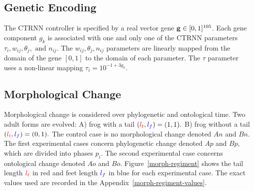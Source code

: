 \subsection{Genetic Encoding}

The CTRNN controller is specified by a real vector gene $\mathbf{g} \in [0,
  1]^{105}$.  Each gene component $g_k$ is associated with one and
only one of the CTRNN parameters $\tau_i, w_{ij}, \theta_j, \text{ and }
n_{ij}$.  The $w_{ij}, \theta_j, n_{ij}$ parameters are linearly
mapped from the domain of the gene $[0,1]$ to the domain of each
parameter.  The $\tau$ parameter uses a non-linear mapping $\tau_i =
10^{-1 + 3 g_k}$.  

\subsection{Morphological Change}

Morphological change is considered over phylogenetic and ontological
time.  Two adult forms are evolved: A) frog with a tail $(\color{red}l_t\color{black},
\color{blue}l_f\color{black}) = (1,1).$ B) frog without a tail $(\color{red}l_t\color{black}, \color{blue}l_f\color{black}) =
(0,1).$ The control case is no morphological change denoted $An$ and
$Bn$.  The first experimental cases concern phylogenetic change
denoted $Ap$ and $Bp$, which are divided into phases $p_i$.  The
second experimental case concerns ontological change denoted $Ao$ and
$Bo$.  Figure~\ref{morph-regiment} shows the tail length $\color{red}l_t\color{black}$ in
red and feet length $\color{blue}l_f\color{black}$ in blue for each experimental case.
The exact values used are recorded in the
Appendix~\ref{morph-regiment-values}.


